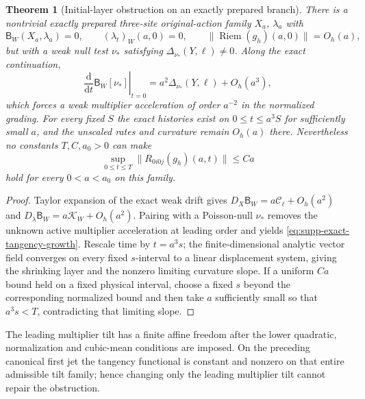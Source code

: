 \documentclass[11pt]{article}
\newtheorem{theorem}{Theorem}[section]
\numberwithin{equation}{section}
\theoremstyle{definition}
\theoremstyle{remark}
\newcommand{\dd}{\mathrm d}
\begin{document}
\begin{theorem}[Initial-layer obstruction on an exactly prepared branch]
\label{thm:supp-exact-initial-layer}
There is a nontrivial exactly prepared three-site original-action family
$X_a$, $\lambda_a$ with
\begin{equation}
 \mathsf B_W(X_a,\lambda_a)=0,
 \qquad (\lambda_t)_W(a,0)=0,
 \qquad \|\operatorname{Riem}(g_h)(a,0)\|=O_h(a),
 \label{eq:supp-exact-prepared-zero-rate}
\end{equation}
but with a weak null test $\nu_*$ satisfying
$\Delta_{\nu_*}(Y,\ell)\ne0$.  Along the exact continuation,
\begin{equation}
 \left.\frac{\dd}{\dd t}\mathsf B_W[\nu_*]\right|_{t=0}
 =a^2\Delta_{\nu_*}(Y,\ell)+O_h(a^3),
 \label{eq:supp-exact-tangency-growth}
\end{equation}
which forces a weak multiplier acceleration of order $a^{-2}$ in the
normalized grading.  For every fixed $S$ the exact histories exist on
$0\le t\le a^3S$ for sufficiently small $a$, and the unscaled rates and
curvature remain $O_h(a)$ there.  Nevertheless no constants $T,C,a_0>0$ can
make
\begin{equation}
 \sup_{0\le t\le T}\|R_{0i0j}(g_h)(a,t)\|\le Ca
 \label{eq:supp-exact-no-linear-fixed-time}
\end{equation}
hold for every $0<a<a_0$ on this family.
\end{theorem}
\begin{proof}
Taylor expansion of the exact weak drift gives
$D_X\mathsf B_W=a\mathcal C_\ell+O_h(a^2)$ and
$D_\lambda\mathsf B_W=a\mathcal K_W+O_h(a^2)$.  Pairing with a Poisson-null
$\nu_*$ removes the unknown active multiplier acceleration at leading order
and yields \eqref{eq:supp-exact-tangency-growth}.  Rescale time by
$t=a^3s$; the finite-dimensional analytic vector field converges on every
fixed $s$-interval to a linear displacement system, giving the shrinking
layer and the nonzero limiting curvature slope.  If a uniform $Ca$ bound
held on a fixed physical interval, choose a fixed $s$ beyond the corresponding
normalized bound and then take $a$ sufficiently small so that $a^3s<T$,
contradicting that limiting slope.
\end{proof}

The leading multiplier tilt has a finite affine freedom after the lower
quadratic, normalization and cubic-mean conditions are imposed.  On the
preceding canonical first jet the tangency functional is constant and nonzero
on that entire admissible tilt family; hence changing only the leading
multiplier tilt cannot repair the obstruction.
\end{document}
